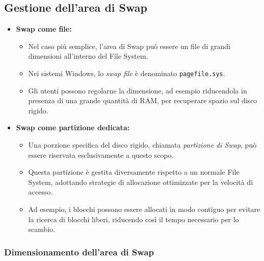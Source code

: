 \subsection{Gestione dell'area di Swap}

\begin{itemize}
    \item \textbf{Swap come file:} 
    \begin{itemize}
        \item Nel caso più semplice, l’area di Swap può essere un file di grandi dimensioni all’interno del File System.
        \item Nei sistemi Windows, lo \textit{swap file} è denominato \texttt{pagefile.sys}. 
        \item Gli utenti possono regolarne la dimensione, ad esempio riducendola in presenza di una grande quantità di RAM, per recuperare spazio sul disco rigido.
    \end{itemize}

    \item \textbf{Swap come partizione dedicata:}
    \begin{itemize}
        \item Una porzione specifica del disco rigido, chiamata \textit{partizione di Swap}, può essere riservata esclusivamente a questo scopo.
        \item Questa partizione è gestita diversamente rispetto a un normale File System, adottando strategie di allocazione ottimizzate per la velocità di accesso.
        \item Ad esempio, i blocchi possono essere allocati in modo contiguo per evitare la ricerca di blocchi liberi, riducendo così il tempo necessario per lo scambio.
    \end{itemize}
\end{itemize}

\subsubsection{Dimensionamento dell'area di Swap}


